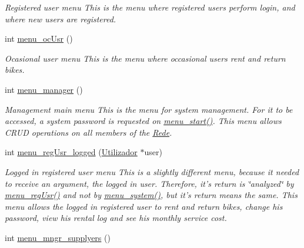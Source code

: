 \begin{DoxyCompactItemize}
\begin{DoxyCompactList}\small\item\em Registered user menu This is the menu where registered users perform login, and where new users are registered. \end{DoxyCompactList}\item 
\hypertarget{class_rede_a8865f7a80236b7a399e948a486c86bac}{int \hyperlink{class_rede_a8865f7a80236b7a399e948a486c86bac}{menu\+\_\+oc\+Usr} ()}\label{class_rede_a8865f7a80236b7a399e948a486c86bac}

\begin{DoxyCompactList}\small\item\em Ocasional user menu This is the menu where occasional users rent and return bikes. \end{DoxyCompactList}\item 
\hypertarget{class_rede_a71b157db8d1ec17c2e5100faeb95e3d2}{int \hyperlink{class_rede_a71b157db8d1ec17c2e5100faeb95e3d2}{menu\+\_\+manager} ()}\label{class_rede_a71b157db8d1ec17c2e5100faeb95e3d2}

\begin{DoxyCompactList}\small\item\em Management main menu This is the menu for system management. For it to be accessed, a system password is requested on \hyperlink{class_rede_ad5f01d997329c28cc736b42e9962c2b6}{menu\+\_\+start()}. This menu allows C\+R\+U\+D operations on all members of the \hyperlink{class_rede}{Rede}. \end{DoxyCompactList}\item 
int \hyperlink{class_rede_af5dd3d55b3cb2f252349128787a96e27}{menu\+\_\+reg\+Usr\+\_\+logged} (\hyperlink{class_utilizador}{Utilizador} $\ast$user)
\begin{DoxyCompactList}\small\item\em Logged in registered user menu This is a slightly different menu, because it needed to receive an argument, the logged in user. Therefore, it's return is \char`\"{}analyzed\char`\"{} by \hyperlink{class_rede_aa36d94723cae863269eb20375c4491c4}{menu\+\_\+reg\+Usr()} and not by \hyperlink{class_rede_a906023ec85b2043b4610e627951e93b8}{menu\+\_\+system()}, but it's return means the same. This menu allows the logged in registered user to rent and return bikes, change his password, view his rental log and see his monthly service cost. \end{DoxyCompactList}\item 
\hypertarget{class_rede_a11e8c9a0d004251882872f9cc3da54da}{int \hyperlink{class_rede_a11e8c9a0d004251882872f9cc3da54da}{menu\+\_\+mngr\+\_\+supplyers} ()}\label{class_rede_a11e8c9a0d004251882872f9cc3da54da}


\end{DoxyCompactItemize}
